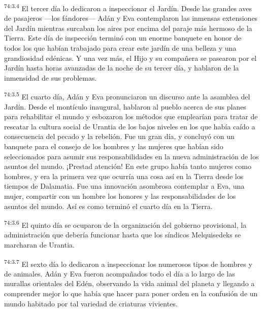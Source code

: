 \par
\textsuperscript{74:3.4} El tercer día lo dedicaron a inspeccionar el Jardín. Desde las grandes aves de pasajeros ---los fándores--- Adán y Eva contemplaron las inmensas extensiones del Jardín mientras surcaban los aires por encima del paraje más hermoso de la Tierra. Este día de inspección terminó con un enorme banquete en honor de todos los que habían trabajado para crear este jardín de una belleza y una grandiosidad edénicas. Y una vez más, el Hijo y su compañera se pasearon por el Jardín hasta horas avanzadas de la noche de su tercer día, y hablaron de la inmensidad de sus problemas.

\par
\textsuperscript{74:3.5} El cuarto día, Adán y Eva pronunciaron un discurso ante la asamblea del Jardín. Desde el montículo inaugural, hablaron al pueblo acerca de sus planes para rehabilitar el mundo y esbozaron los métodos que emplearían para tratar de rescatar la cultura social de Urantia de los bajos niveles en los que había caído a consecuencia del pecado y la rebelión. Fue un gran día, y concluyó con un banquete para el consejo de los hombres y las mujeres que habían sido seleccionados para asumir sus responsabilidades en la nueva administración de los asuntos del mundo. ¡Prestad atención! En este grupo había tanto mujeres como hombres, y era la primera vez que ocurría una cosa así en la Tierra desde los tiempos de Dalamatia. Fue una innovación asombrosa contemplar a Eva, una mujer, compartir con un hombre los honores y las responsabilidades de los asuntos del mundo. Así es como terminó el cuarto día en la Tierra.

\par
\textsuperscript{74:3.6} El quinto día se ocuparon de la organización del gobierno provisional, la administración que debería funcionar hasta que los síndicos Melquisedeks se marcharan de Urantia.

\par
\textsuperscript{74:3.7} El sexto día lo dedicaron a inspeccionar los numerosos tipos de hombres y de animales. Adán y Eva fueron acompañados todo el día a lo largo de las murallas orientales del Edén, observando la vida animal del planeta y llegando a comprender mejor lo que había que hacer para poner orden en la confusión de un mundo habitado por tal variedad de criaturas vivientes.

